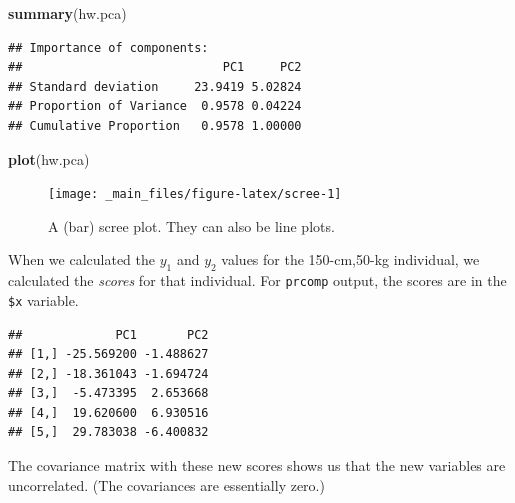 \documentclass[
]{book}
\newenvironment{Shaded}{\begin{snugshade}}{\end{snugshade}}
\newcommand{\FunctionTok}[1]{\textcolor[rgb]{0.13,0.29,0.53}{\textbf{#1}}}
\newcommand{\NormalTok}[1]{#1}
\newcommand{\SpecialCharTok}[1]{\textcolor[rgb]{0.81,0.36,0.00}{\textbf{#1}}}
\theoremstyle{definition}
\theoremstyle{definition}
\theoremstyle{definition}
\theoremstyle{definition}
\theoremstyle{remark}
\begin{document}
\begin{Shaded}
\begin{Highlighting}[]
\FunctionTok{summary}\NormalTok{(hw.pca)}
\end{Highlighting}
\end{Shaded}

\begin{verbatim}
## Importance of components:
##                            PC1     PC2
## Standard deviation     23.9419 5.02824
## Proportion of Variance  0.9578 0.04224
## Cumulative Proportion   0.9578 1.00000
\end{verbatim}

\begin{Shaded}
\begin{Highlighting}[]
\FunctionTok{plot}\NormalTok{(hw.pca)}
\end{Highlighting}
\end{Shaded}

\begin{figure}

{\centering \texttt{[image: \_main\_files/figure-latex/scree-1]} 

}

\caption{A (bar) scree plot. They can also be line plots.}\label{fig:scree}
\end{figure}

When we calculated the \(y_1\) and \(y_2\) values for the 150-cm,50-kg individual, we calculated the \emph{scores} for that individual. For \texttt{prcomp} output, the scores are in the \texttt{\$x} variable.

\begin{Shaded}
\end{Shaded}

\begin{verbatim}
##             PC1       PC2
## [1,] -25.569200 -1.488627
## [2,] -18.361043 -1.694724
## [3,]  -5.473395  2.653668
## [4,]  19.620600  6.930516
## [5,]  29.783038 -6.400832
\end{verbatim}

The covariance matrix with these new scores shows us that the new variables are uncorrelated. (The covariances are essentially zero.)

\begin{Shaded}
\end{Shaded}
\end{document}
